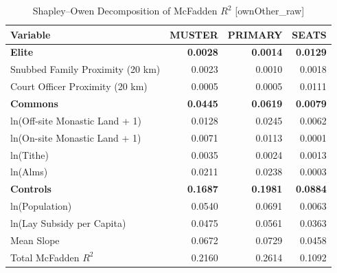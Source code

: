 \begin{table}[H]
\centering
\caption{Shapley--Owen Decomposition of McFadden $R^2$ [ownOther_raw]}
\label{tab:shapley_owen_ownOther_raw}
\begin{tabular}{lrrr}
\hline\hline
Variable & MUSTER & PRIMARY & SEATS \\
\hline
\textbf{Elite} & \textbf{0.0028} & \textbf{0.0014} & \textbf{0.0129} \\
\quad Snubbed Family Proximity (20 km) & 0.0023 & 0.0010 & 0.0018 \\
\quad Court Officer Proximity (20 km) & 0.0005 & 0.0005 & 0.0111 \\
\textbf{Commons} & \textbf{0.0445} & \textbf{0.0619} & \textbf{0.0079} \\
\quad ln(Off-site Monastic Land + 1) & 0.0128 & 0.0245 & 0.0062 \\
\quad ln(On-site Monastic Land + 1) & 0.0071 & 0.0113 & 0.0001 \\
\quad ln(Tithe) & 0.0035 & 0.0024 & 0.0013 \\
\quad ln(Alms) & 0.0211 & 0.0238 & 0.0003 \\
\textbf{Controls} & \textbf{0.1687} & \textbf{0.1981} & \textbf{0.0884} \\
\quad ln(Population) & 0.0540 & 0.0691 & 0.0063 \\
\quad ln(Lay Subsidy per Capita) & 0.0475 & 0.0561 & 0.0363 \\
\quad Mean Slope & 0.0672 & 0.0729 & 0.0458 \\
\hline
Total McFadden $R^2$ & 0.2160 & 0.2614 & 0.1092 \\
\hline\hline
\end{tabular}
\end{table}
